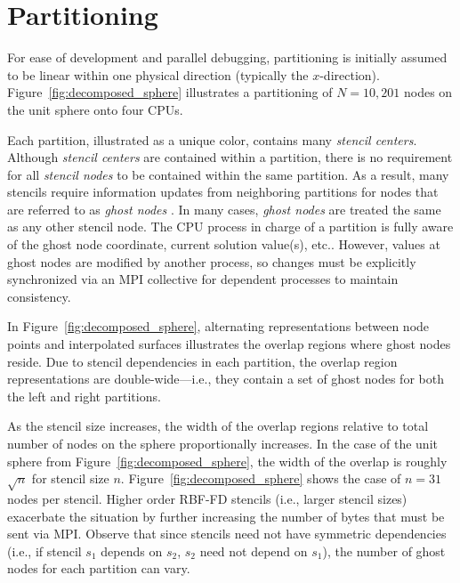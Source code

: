 \documentclass{report}
\begin{document}

\section{Partitioning}

For ease of development and parallel debugging, partitioning is initially
assumed to be linear within one physical direction (typically the
$x$-direction). Figure~\ref{fig:decomposed_sphere} illustrates a partitioning of
$N=10,201$ nodes on the unit sphere onto four CPUs.

Each partition, illustrated
as a unique color, contains many \emph{stencil centers}. Although \emph{stencil centers} are contained within a partition, there is no requirement for all \emph{stencil nodes} to be contained within the same partition. As a result, many stencils require information updates from neighboring partitions for nodes that are referred to as \emph{ghost nodes} \cite{NeEDREF}. %
In many cases, \emph{ghost nodes} are treated the same as any other stencil node. The CPU process in charge of a partition is fully aware of the ghost node coordinate, current solution value(s), etc.. However, values at ghost nodes are modified by another process, so changes must be explicitly synchronized via an MPI collective for dependent processes to maintain consistency. 

In Figure~\ref{fig:decomposed_sphere}, alternating representations between node points and interpolated surfaces illustrates the
overlap regions where ghost nodes reside. Due to stencil dependencies in each partition, the overlap region representations are double-wide---i.e., they contain a set of ghost nodes for both the left and right partitions. 

As the stencil size increases, the width of the
overlap regions relative to total number of nodes on the sphere proportionally increases. In the case of the unit sphere from Figure~\ref{fig:decomposed_sphere}, the width of the overlap is roughly $\sqrt{n}$ for stencil size $n$. Figure~\ref{fig:decomposed_sphere} shows the case of $n=31$ nodes per stencil. Higher order RBF-FD stencils (i.e., larger stencil sizes) exacerbate the situation by further increasing the number of bytes that must be sent via MPI. Observe that since stencils need not have symmetric dependencies (i.e., if stencil $s_1$ depends on $s_2$, $s_2$ need not depend on $s_1$), the number of ghost nodes for each partition can vary.
\end{document}
